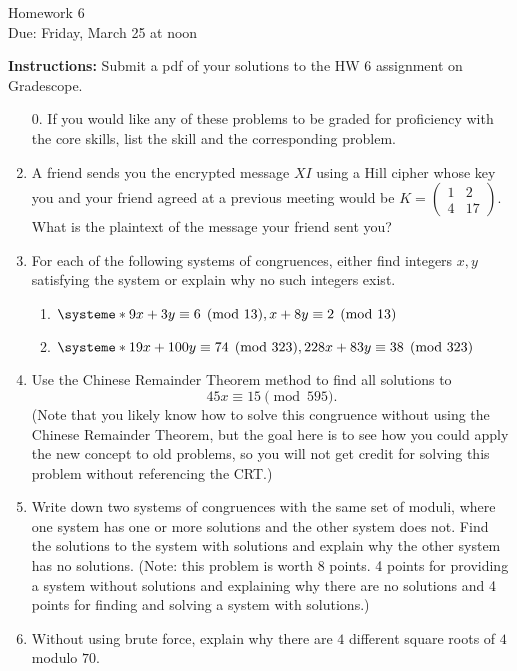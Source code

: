 \documentclass[12pt]{article}
\newcommand{\ds}{\displaystyle}
\begin{document}
\begin{center}
{\Large Homework 6}\\
Due: Friday,  March 25 at noon\\


\end{center}
{\bf Instructions:} Submit a pdf of your solutions to the HW 6 assignment on Gradescope. 



\begin{enumerate}
\item[0.] If you would like any of these problems to be graded for proficiency with the core skills, list the skill and the corresponding problem. 
 \item  A friend sends you the encrypted message $XI$ using a Hill cipher whose key you and your friend agreed at a previous meeting would be $K = \begin{pmatrix}
1 & 2\\ 
4 & 17
\end{pmatrix}$.  What is the plaintext of the message your friend sent you?

\item For each of the following systems of congruences, either find integers $x,y$ satisfying the system or explain why no such integers exist. 
\begin{enumerate}
\item  $\ds
\systeme*{9x+3y \equiv 6 \pmod {13}, x+8y \equiv 2 \pmod {13}}$
\item $\ds \systeme*{19x+100y \equiv 74 \pmod {323}, 228x+83y \equiv 38 \pmod {323}}$
\end{enumerate} 
\item Use the Chinese Remainder Theorem method to find all solutions to $$45x\equiv 15 \pmod{595}.$$ (Note that you likely know how to solve this congruence without using the Chinese Remainder Theorem, but the goal here is to see how you could apply the new concept to old problems, so you will not get credit for solving this problem without referencing the CRT.)
\item Write down two systems of congruences with the same set of moduli, where one system has one or more solutions and the other system does not.  Find the solutions to the system with solutions and explain why the other system has no solutions. 
(Note: this problem is worth 8 points.  4 points for providing a system without solutions and explaining why there are no solutions and 4 points for finding and solving a system with solutions.)
\item Without using brute force, explain why there are $4$ different square roots of $4$ modulo $70$.  
\end{enumerate}
\end{document}
